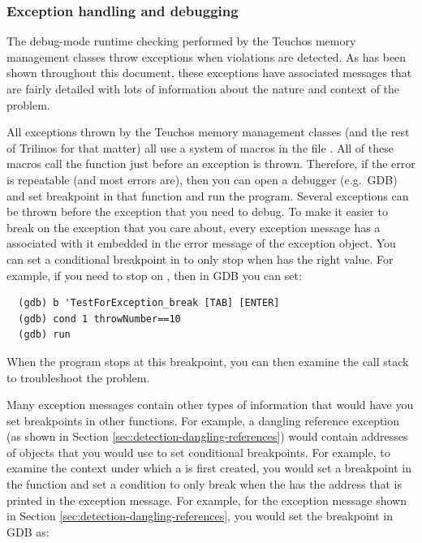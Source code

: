 \documentclass[pdf,ps2pdf,11pt]{SANDreport}
\begin{document}
%
{}\subsubsection{Exception handling and debugging}
\label{sec:except-handling-debugging}
%

The debug-mode runtime checking performed by the Teuchos memory
management classes throw exceptions when violations are detected.  As
has been shown throughout this document, these exceptions have
associated messages that are fairly detailed with lots of information
about the nature and context of the problem.

All exceptions thrown by the Teuchos memory management classes (and
the rest of Trilinos for that matter) all use a system of macros in
the file {}.  All of these
macros call the function {} just
before an exception is thrown.  Therefore, if the error is repeatable
(and most errors are), then you can open a debugger (e.g.\ GDB) and
set breakpoint in that function and run the program.  Several
exceptions can be thrown before the exception that you need to debug.
To make it easier to break on the exception that you care about, every
exception message has a {} associated with it
embedded in the error message of the exception object.  You can set a
conditional breakpoint in {} to
only stop when {} has the right value.  For
example, if you need to stop on {}, then in
GDB you can set:

{\small\begin{verbatim}
  (gdb) b 'TestForException_break [TAB] [ENTER]
  (gdb) cond 1 throwNumber==10
  (gdb) run
\end{verbatim}}

When the program stops at this breakpoint, you can then examine the
call stack to troubleshoot the problem.

Many exception messages contain other types of information that would
have you set breakpoints in other functions.  For example, a dangling
reference exception (as shown in Section
{}\ref{sec:detection-dangling-references}) would contain addresses of
objects that you would use to set conditional breakpoints.  For
example, to examine the context under which a {} is
first created, you would set a breakpoint in the function
{} and set a
condition to only break when the {} has the address
that is printed in the exception message.  For example, for the
exception message shown in Section
{}\ref{sec:detection-dangling-references}, you would set the
breakpoint in GDB as:
\end{document}

